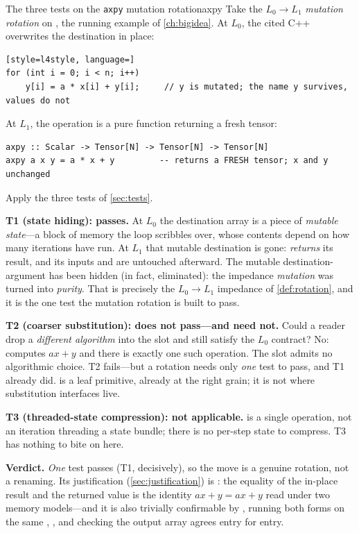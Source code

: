 \begin{workedexample}{The three tests on the \texttt{axpy} mutation rotation}{axpy}
Take the $L_0 \to L_1$ \emph{mutation rotation} on , the running
example of \cref{ch:bigidea}. At $L_0$, the cited C++ overwrites the destination
in place:
\begin{lstlisting}[style=l4style, language=]
for (int i = 0; i < n; i++)
    y[i] = a * x[i] + y[i];     // y is mutated; the name y survives, values do not
\end{lstlisting}
At $L_1$, the operation is a pure function returning a fresh tensor:
\begin{lstlisting}[style=l4style]
axpy :: Scalar -> Tensor[N] -> Tensor[N] -> Tensor[N]
axpy a x y = a * x + y         -- returns a FRESH tensor; x and y unchanged
\end{lstlisting}

Apply the three tests of \cref{sec:tests}.

\textbf{T1 (state hiding): passes.} At $L_0$ the destination array  is a
piece of \emph{mutable state}---a block of memory the loop scribbles over, whose
contents depend on how many iterations have run. At $L_1$ that mutable destination
is gone:  \emph{returns} its result, and its inputs  and
 are untouched afterward. The mutable destination-argument has been hidden
(in fact, eliminated): the impedance \emph{mutation} was turned into \emph{purity}.
That is precisely the $L_0\!\to\!L_1$ impedance of \cref{def:rotation}, and it is
the one test the mutation rotation is built to pass.

\textbf{T2 (coarser substitution): does not pass---and need not.} Could a reader
drop a \emph{different algorithm} into the  slot and still satisfy the
$L_0$ contract? No:  computes $a x + y$ and there is exactly one such
operation. The slot admits no algorithmic choice. T2 fails---but a rotation needs
only \emph{one} test to pass, and T1 already did.  is a leaf primitive,
already at the right grain; it is not where substitution interfaces live.

\textbf{T3 (threaded-state compression): not applicable.}  is a single
operation, not an iteration threading a state bundle; there is no per-step state to
compress. T3 has nothing to bite on here.

\textbf{Verdict.} \emph{One} test passes (T1, decisively), so the move is a
genuine rotation, not a renaming. Its justification (\cref{sec:justification}) is
: the equality of the in-place result and the returned value is the
identity $a x + y = a x + y$ read under two memory models---and it is also trivially
confirmable by , running both forms on the same ,
,  and checking the output array agrees entry for entry.
\end{workedexample}

